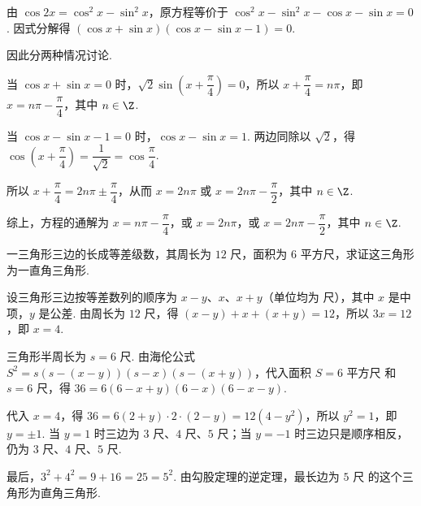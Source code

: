 \begin{solution}
由 \(\cos 2x=\cos^{2}x-\sin^{2}x\)，原方程等价于 \(\cos^{2}x-\sin^{2}x-\cos x-\sin x=0\). 因式分解得 \(\left(\cos x+\sin x\right)\left(\cos x-\sin x-1\right)=0\).

因此分两种情况讨论.

当 \(\cos x+\sin x=0\) 时，\(\sqrt{2}\sin\left(x+\dfrac{\pi}{4}\right)=0\)，所以 \(x+\dfrac{\pi}{4}=n\pi\)，即 \(x=n\pi-\dfrac{\pi}{4}\)，其中 \(n\in\Z\).

当 \(\cos x-\sin x-1=0\) 时，\(\cos x-\sin x=1\). 两边同除以 \(\sqrt{2}\)，得 \(\cos\left(x+\dfrac{\pi}{4}\right)=\dfrac{1}{\sqrt{2}}=\cos\dfrac{\pi}{4}\).

所以 \(x+\dfrac{\pi}{4}=2n\pi\pm\dfrac{\pi}{4}\)，从而 \(x=2n\pi\) 或 \(x=2n\pi-\dfrac{\pi}{2}\)，其中 \(n\in\Z\).

综上，方程的通解为 \(x=n\pi-\dfrac{\pi}{4}\)，或 \(x=2n\pi\)，或 \(x=2n\pi-\dfrac{\pi}{2}\)，其中 \(n\in\Z\).
\end{solution}

\begin{problem}
一三角形三边的长成等差级数，其周长为 \(12\text{ 尺}\)，面积为 \(6\text{ 平方尺}\)，求证这三角形为一直角三角形.
\end{problem}

\begin{solution}
设三角形三边按等差数列的顺序为 \(x-y\)、\(x\)、\(x+y\)（单位均为 \(\text{尺}\)），其中 \(x\) 是中项，\(y\) 是公差. 由周长为 \(12\text{ 尺}\)，得 \((x-y)+x+(x+y)=12\)，所以 \(3x=12\)，即 \(x=4\).

三角形半周长为 \(s=6\text{ 尺}\). 由海伦公式 \(S^{2}=s\left(s-(x-y)\right)\left(s-x\right)\left(s-(x+y)\right)\)，代入面积 \(S=6\text{ 平方尺}\) 和 \(s=6\text{ 尺}\)，得 \(36=6(6-x+y)(6-x)(6-x-y)\).

代入 \(x=4\)，得 \(36=6(2+y)\cdot 2\cdot(2-y)=12(4-y^{2})\)，所以 \(y^{2}=1\)，即 \(y=\pm1\). 当 \(y=1\) 时三边为 \(3\text{ 尺}\)、\(4\text{ 尺}\)、\(5\text{ 尺}\)；当 \(y=-1\) 时三边只是顺序相反，仍为 \(3\text{ 尺}\)、\(4\text{ 尺}\)、\(5\text{ 尺}\).

最后，\(3^{2}+4^{2}=9+16=25=5^{2}\). 由勾股定理的逆定理，最长边为 \(5\text{ 尺}\) 的这个三角形为直角三角形.
\end{solution}
